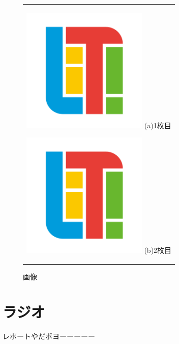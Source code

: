 \documentclass{jsarticle}
\begin{document}
\begin{figure}[H]
\begin{center}
  \begin{tabular}{c}

    \begin{minipage}{0.5\hsize}
      \begin{center}
        \includegraphics[clip, width=60mm]{original.png}
        \hspace{1.6cm} (a)1枚目
      \end{center}
    \end{minipage}

    \begin{minipage}{0.5\hsize}
      \begin{center}
        \includegraphics[clip, width=60mm]{original.png}
        \hspace{1.6cm} (b)2枚目
      \end{center}
    \end{minipage}

  \end{tabular}
  \caption{画像}
  \label{fig:img}
  \end{center}
\end{figure}

\section{ラジオ}


レポートやだポヨーーーーー
\end{document}
